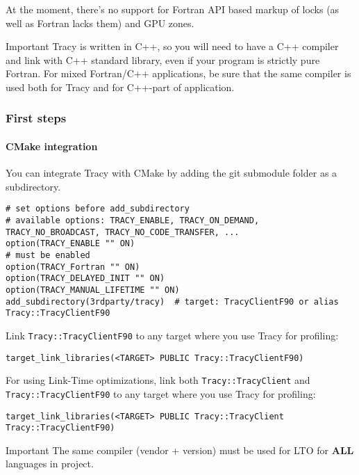 \documentclass[hidelinks,titlepage,a4paper,twoside]{article}
\begin{document}
At the moment, there's no support for Fortran API based markup of locks (as well as Fortran lacks them) and GPU zones.

\begin{bclogo}[
noborder=true,
couleur=black!5,
logo=\bcbombe
]{Important}
Tracy is written in C++, so you will need to have a C++ compiler and link with C++ standard library, even if your program is strictly pure Fortran.
For mixed Fortran/C++ applications, be sure that the same compiler is used both for Tracy and for C++-part of application.
\end{bclogo}

\subsubsection{First steps}

\paragraph{CMake integration}

You can integrate Tracy with CMake by adding the git submodule folder as a subdirectory.

\begin{lstlisting}
# set options before add_subdirectory
# available options: TRACY_ENABLE, TRACY_ON_DEMAND, TRACY_NO_BROADCAST, TRACY_NO_CODE_TRANSFER, ...
option(TRACY_ENABLE "" ON)
# must be enabled
option(TRACY_Fortran "" ON)
option(TRACY_DELAYED_INIT "" ON)
option(TRACY_MANUAL_LIFETIME "" ON)
add_subdirectory(3rdparty/tracy)  # target: TracyClientF90 or alias Tracy::TracyClientF90
\end{lstlisting}

Link \texttt{Tracy::TracyClientF90} to any target where you use Tracy for profiling:

\begin{lstlisting}
target_link_libraries(<TARGET> PUBLIC Tracy::TracyClientF90)
\end{lstlisting}

For using Link-Time optimizations, link both \texttt{Tracy::TracyClient} and \texttt{Tracy::TracyClientF90} to any target where you use Tracy for profiling:

\begin{lstlisting}
target_link_libraries(<TARGET> PUBLIC Tracy::TracyClient Tracy::TracyClientF90)
\end{lstlisting}

\begin{bclogo}[
noborder=true,
couleur=black!5,
logo=\bcbombe
]{Important}
The same compiler (vendor + version) must be used for LTO for \textbf{ALL} languages in project.
\end{bclogo}
\end{document}

